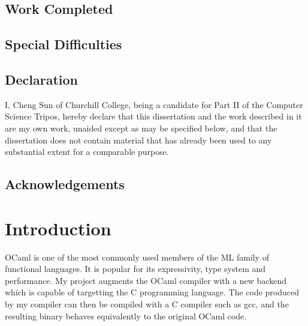 \documentclass[12pt,a4paper,twoside,openright]{report}
\begin{document}
\section*{Work Completed}


\section*{Special Difficulties}

 
\newpage
\section*{Declaration}

I, Cheng Sun of Churchill College, being a candidate for Part II of the Computer
Science Tripos, hereby declare
that this dissertation and the work described in it are my own work,
unaided except as may be specified below, and that the dissertation
does not contain material that has already been used to any substantial
extent for a comparable purpose.

\bigskip
{}

\medskip
{}

\tableofcontents

\newpage
\section*{Acknowledgements}



\pagestyle{headings}

\chapter{Introduction}

OCaml is one of the most commonly used members of the ML family of functional
languages. It is popular for its expressivity, type system and performance.
My project augments the OCaml compiler with a new backend which is capable of
targetting the C programming language. The code produced by my compiler can
then be compiled with a C compiler such as gcc, and the resulting binary behaves
equivalently to the original OCaml code.
\end{document}
